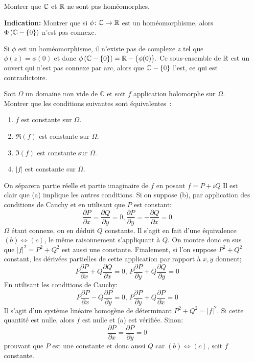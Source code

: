 \documentclass[a4paper, 12pt]{amsart}
\newcommand{\pd}[2]{\ensuremath{\frac{\partial #1}{\partial #2}}}
\begin{document}
\begin{fex}
   Montrer que $\mathbb{C}$ et $\mathbb{R}$ ne sont pas homéomorphes. 
    
    \textbf{Indication:} Montrer que si $\phi \colon \mathbb{C} \to \mathbb{R}$ est un homéomorphisme, alors $\Phi\left(\mathbb{C}-\{0\}\right)$ n'est pas connexe.    
\end{fex}
Si $\phi$ est un homéomorphisme, il n'existe pas de complexe $z$ tel que $\phi(z)=\phi(0)$ et donc
$\phi\left(\mathbb{C} - \{0\}\right)=\mathbb{R}-\{\phi(0)\}.$ Ce sous-ensemble de $\mathbb{R}$ est un ouvert qui n'est pas
connexe par arc, alors que $\mathbb{C} - \{0\}$ l'est, ce qui est contradictoire.

\begin{fex}
 Soit $\Omega$ un domaine non vide de $\mathbb{C}$ et soit $f$ application
holomorphe sur $\Omega$. Montrer que les conditions suivantes sont
équivalentes~:
\renewcommand{\theenumi}{\alph{enumi}}
\begin{enumerate}
\item $f$ est constante sur $\Omega$.
\item $\Re(f)$ est constante sur $\Omega$.
\item $\Im(f)$ est constante sur $\Omega$.
\item $|f|$ est constante sur $\Omega$.
\end{enumerate}
\end{fex}
On séparera partie réelle et partie imaginaire de $f$ en posant $f=P+iQ$
Il est clair que (a) implique les autres conditions. Si on suppose (b), par
application des conditions de Cauchy et en utilisant que $P$ est constant:
\[
 \pd{P}{x} = \pd{Q}{y} = 0 , \pd{P}{y}=-\pd{Q}{x} = 0
\]
$\Omega$ étant connexe, on en déduit $Q$ constante. Il s'agit en fait d'une
équivalence $(b) \Leftrightarrow (c)$, le même raisonnement s'appliquant à $Q$.
On montre donc en sus que $|f|^2=P^2+Q^2$ est aussi une constante.
Finalement, si l'on suppose $P^2+Q^2$ constant, les dérivées partielles de
cette application par rapport à $x,y$ donnent;
\[
 P\pd{P}{x}+Q\pd{Q}{x}= 0,\,  P\pd{P}{y}+Q\pd{Q}{y}= 0
\]
En utilisant les conditions de Cauchy:
\[
 P\pd{P}{x}-Q\pd{P}{y}= 0,\,  P\pd{P}{y}+Q\pd{P}{x}= 0
\]
Il s'agit d'un système linéaire homogène de déterminant $P^2+Q^2=|f|^2$. Si
cette quantité est nulle, alors $f$ est nulle et (a) est vérifiée. Sinon:
\[
 \pd{P}{x}=\pd{P}{y}=0
\]
prouvant que $P$ est une constante et donc aussi $Q$ car $(b) \Leftrightarrow
(c)$, soit $f$ constante.
\end{document}
